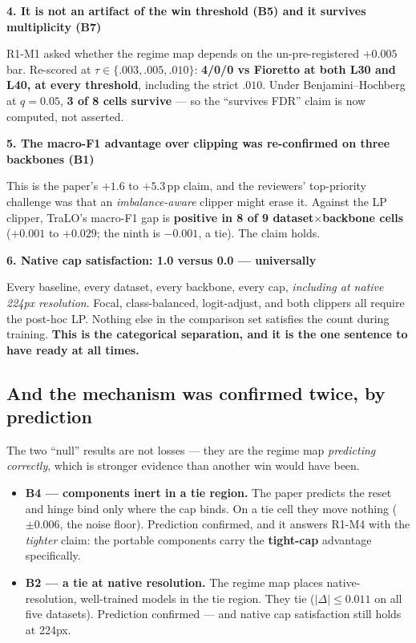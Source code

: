 \documentclass[11pt,a4paper]{article}
\newenvironment{callout}[1]
  {\par\medskip\noindent\begin{lrbox}{\calloutbox}%
   \begin{minipage}{\dimexpr\linewidth-20pt\relax}%
   \textbf{#1}\par\smallskip}
  {\end{minipage}\end{lrbox}%
   \setlength{\fboxsep}{10pt}%
   \colorbox{boxgrey}{\usebox{\calloutbox}}\par\medskip}
\begin{document}
\begin{callout}{4. It is not an artifact of the win threshold (B5) and it survives multiplicity (B7)}
R1-M1 asked whether the regime map depends on the un-pre-registered $+0.005$ bar. Re-scored at
$\tau \in \{.003, .005, .010\}$: \textbf{4/0/0 vs Fioretto at both L30 and L40, at every threshold},
including the strict $.010$. Under Benjamini--Hochberg at $q{=}0.05$, \textbf{3 of 8 cells survive}
--- so the ``survives FDR'' claim is now computed, not asserted.
\end{callout}

\begin{callout}{5. The macro-F1 advantage over clipping was re-confirmed on three backbones (B1)}
This is the paper's $+1.6$ to $+5.3$\,pp claim, and the reviewers' top-priority challenge was that
an \emph{imbalance-aware} clipper might erase it. Against the LP clipper, TraLO's macro-F1 gap is
\textbf{positive in 8 of 9 dataset$\times$backbone cells} ($+0.001$ to $+0.029$; the ninth is
$-0.001$, a tie). The claim holds.
\end{callout}

\begin{callout}{6. Native cap satisfaction: 1.0 versus 0.0 --- universally}
Every baseline, every dataset, every backbone, every cap, \emph{including at native 224px
resolution}. Focal, class-balanced, logit-adjust, and both clippers all require the post-hoc LP.
Nothing else in the comparison set satisfies the count during training. \textbf{This is the
categorical separation, and it is the one sentence to have ready at all times.}
\end{callout}

\subsection*{And the mechanism was confirmed twice, by prediction}

The two ``null'' results are not losses --- they are the regime map \emph{predicting correctly},
which is stronger evidence than another win would have been.

\begin{itemize}
\item \textbf{B4 --- components inert in a tie region.} The paper predicts the reset and hinge bind
      only where the cap binds. On a tie cell they move nothing ($\pm0.006$, the noise floor).
      Prediction confirmed, and it answers R1-M4 with the \emph{tighter} claim: the portable
      components carry the \textbf{tight-cap} advantage specifically.
\item \textbf{B2 --- a tie at native resolution.} The regime map places native-resolution,
      well-trained models in the tie region. They tie ($|\Delta| \le 0.011$ on all five datasets).
      Prediction confirmed --- and native cap satisfaction still holds at 224px.
\end{itemize}
\end{document}
